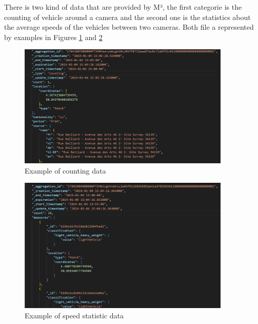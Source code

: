 \documentclass[12pt]{report}
\begin{document}
	There is two kind of data that are provided by M³, the  first categorie  is the counting of vehicle around a camera and the second one is the statistics about the average speeds of the vehicles between two cameras. Both file a represented by examples in Figures \ref{img:M3count} and \ref{img:M3stats}
	
	\begin{center}
		\begin{figure}
			\centering
			\includegraphics[width=0.9\textwidth]{images/M3count.png}
			\caption{Example of counting data}
			\label{img:M3count}
		\end{figure}
	\end{center}
	
	\begin{center}
		\begin{figure}
			\centering
			\includegraphics[width=0.9\textwidth]{images/M3stats.png}
			\caption{Example of speed statistic data}
			\label{img:M3stats}
		\end{figure}
	\end{center}
	
	 
	 
\end{document}
